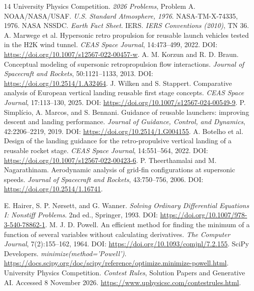\documentclass[11pt,a4paper]{article}
\begin{document}
\clearpage
{}
{}
\begin{thebibliography}{14}
\small
{} University Physics Competition. \emph{2026 Problems}, Problem A.
 NOAA/NASA/USAF. \emph{U.S. Standard Atmosphere, 1976}. NASA-TM-X-74335, 1976.
 NASA NSSDC. \emph{Earth Fact Sheet}.
 IERS. \emph{IERS Conventions (2010)}, TN 36.
 A. Marwege et al. Hypersonic retro propulsion for reusable launch vehicles tested in the H2K wind tunnel. \emph{CEAS Space Journal}, 14:473--499, 2022. DOI: \url{https://doi.org/10.1007/s12567-022-00457-w}.
 A. M. Korzun and R. D. Braun. Conceptual modeling of supersonic retropropulsion flow interactions. \emph{Journal of Spacecraft and Rockets}, 50:1121--1133, 2013. DOI: \url{https://doi.org/10.2514/1.A32464}.
 J. Wilken and S. Stappert. Comparative analysis of European vertical landing reusable first stage concepts. \emph{CEAS Space Journal}, 17:113--130, 2025. DOI: \url{https://doi.org/10.1007/s12567-024-00549-9}.
 P. Simpl\'{i}cio, A. Marcos, and S. Bennani. Guidance of reusable launchers: improving descent and landing performance. \emph{Journal of Guidance, Control, and Dynamics}, 42:2206--2219, 2019. DOI: \url{https://doi.org/10.2514/1.G004155}.
 A. Botelho et al. Design of the landing guidance for the retro-propulsive vertical landing of a reusable rocket stage. \emph{CEAS Space Journal}, 14:551--564, 2022. DOI: \url{https://doi.org/10.1007/s12567-022-00423-6}.
 P. Theerthamalai and M. Nagarathinam. Aerodynamic analysis of grid-fin configurations at supersonic speeds. \emph{Journal of Spacecraft and Rockets}, 43:750--756, 2006. DOI: \url{https://doi.org/10.2514/1.16741}.

 E. Hairer, S. P. N\o rsett, and G. Wanner. \emph{Solving Ordinary Differential Equations I: Nonstiff Problems}. 2nd ed., Springer, 1993. DOI: \url{https://doi.org/10.1007/978-3-540-78862-1}.
 M. J. D. Powell. An efficient method for finding the minimum of a function of several variables without calculating derivatives. \emph{The Computer Journal}, 7(2):155--162, 1964. DOI: \url{https://doi.org/10.1093/comjnl/7.2.155}.
 SciPy Developers. \emph{minimize(method='Powell')}. \url{https://docs.scipy.org/doc/scipy/reference/optimize.minimize-powell.html}.
 University Physics Competition. \emph{Contest Rules}, Solution Papers and Generative AI. Accessed 8 November 2026. \url{https://www.uphysicsc.com/contestrules.html}.

\end{thebibliography}
\end{document}
